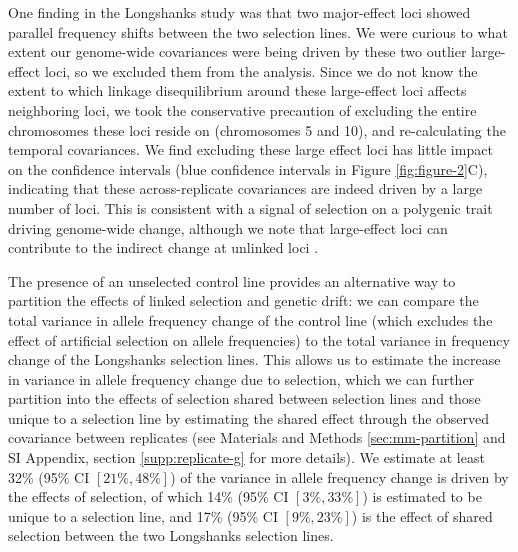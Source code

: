 \documentclass[9pt,twocolumn,twoside]{pnas-new}
\begin{document}
One finding in the Longshanks study was that two major-effect loci showed
parallel frequency shifts between the two selection lines. We were curious to
what extent our genome-wide covariances were being driven by these two outlier
large-effect loci, so we excluded them from the analysis. Since we do not know
the extent to which linkage disequilibrium around these large-effect loci
affects neighboring loci, we took the conservative precaution of excluding the
entire chromosomes these loci reside on (chromosomes 5 and 10), and
re-calculating the temporal covariances. We find excluding these large effect
loci has little impact on the confidence intervals (blue confidence intervals
in Figure \ref{fig:figure-2}C), indicating that these across-replicate
covariances are indeed driven by a large number of loci. This is consistent
with a signal of selection on a polygenic trait driving genome-wide change,
although we note that large-effect loci can contribute to the indirect change
at unlinked loci \cite{Robertson1961-ho,Santiago1995-hx}. 

The presence of an unselected control line provides an alternative way to
partition the effects of linked selection and genetic drift: we can compare the
total variance in allele frequency change of the control line (which excludes
the effect of artificial selection on allele frequencies) to the total variance
in frequency change of the Longshanks selection lines. This allows us to
estimate the increase in variance in allele frequency change due to selection,
which we can further partition into the effects of selection shared between
selection lines and those unique to a selection line by estimating the shared
effect through the observed covariance between replicates (see Materials and
Methods \ref{sec:mm-partition} and SI Appendix, section
\ref{supp:replicate-g} for more details).  We estimate at least 32\% (95\% CI
$[21\%, 48\%]$) of the variance in allele frequency change is driven by the
effects of selection, of which 14\% (95\% CI $[3\%, 33\%]$) is estimated to be
unique to a selection line, and 17\% (95\% CI $[9\%, 23\%]$) is the effect of
shared selection between the two Longshanks selection lines. 
\end{document}
